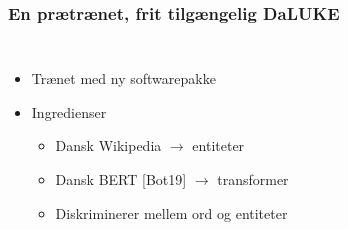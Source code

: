 \documentclass{beamer}
\begin{document}
\begin{frame}
    \frametitle{En prætrænet, frit tilgængelig DaLUKE}
    \begin{columns}
        \begin{itemize}
            \item Trænet med ny softwarepakke
            \item Ingredienser
                \begin{itemize}
                    \item Dansk Wikipedia $\rightarrow$ entiteter
                    \item Dansk BERT [Bot19] $\rightarrow$ transformer
                    \item Diskriminerer mellem ord og entiteter
                \end{itemize}
        \end{itemize}

        \begin{figure}[H]
            \centering
            
        \end{figure}\noindent
        \begin{example}
            \footnotesize
            \begin{overlayarea}{\textwidth}{1cm}
            \end{overlayarea}
        \end{example}
    \end{columns}
\end{frame}
\end{document}

